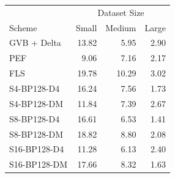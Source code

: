 \begin{tabular}{lrrr}
\toprule
 & \multicolumn{3}{c}{Dataset Size} \\
Scheme & Small & Medium & Large \\
\midrule
GVB + Delta & 13.82 & 5.95 & 2.90 \\
PEF & 9.06 & 7.16 & 2.17 \\
FLS & 19.78 & 10.29 & 3.02 \\
S4-BP128-D4 & 16.24 & 7.56 & 1.73 \\
S4-BP128-DM & 11.84 & 7.39 & 2.67 \\
S8-BP128-D4 & 16.61 & 6.53 & 1.41 \\
S8-BP128-DM & 18.82 & 8.80 & 2.08 \\
S16-BP128-D4 & 11.28 & 6.13 & 2.40 \\
S16-BP128-DM & 17.66 & 8.32 & 1.63 \\
\bottomrule
\end{tabular}
